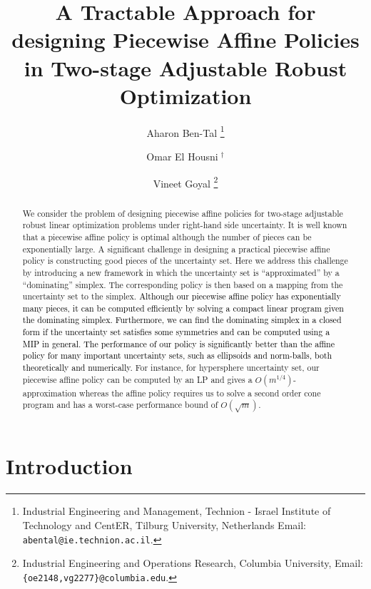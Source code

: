 \documentclass[11pt]{article}
\title{ A Tractable Approach for designing Piecewise Affine Policies in Two-stage Adjustable Robust Optimization}
\author{Aharon Ben-Tal  \thanks{Industrial Engineering and Management, Technion - Israel Institute of Technology and CentER, Tilburg University, Netherlands Email: \texttt{abental@ie.technion.ac.il}.} \and Omar El Housni$\;^{\dagger}$ \and Vineet Goyal \thanks{Industrial Engineering and Operations Research, Columbia University, Email: \texttt{\{oe2148,vg2277\}@columbia.edu}. }}
\theoremstyle{plain}
\theoremstyle{definition}
\numberwithin{equation}{section}%
\numberwithin{equation}{section}%
\newcommand*{\red}{\textcolor{black}}
\begin{document}
\maketitle
\begin{abstract}
We consider the problem of designing piecewise affine policies for
two-stage adjustable robust linear optimization problems under right-hand side
uncertainty. It is well known that a piecewise affine policy is optimal although the number of pieces can be
exponentially large. A significant challenge in designing a practical piecewise affine policy is constructing good pieces of the uncertainty set. Here we address this challenge by introducing a new framework in which the uncertainty set is ``approximated'' by a ``dominating'' simplex. The corresponding policy is then based on a mapping from the uncertainty set to the simplex. \red{Although our piecewise affine policy has exponentially many pieces, it can be computed efficiently by solving a compact linear program given the dominating simplex. Furthermore, we can find the dominating simplex in a closed form if the uncertainty set satisfies some symmetries and can be computed using a MIP in general. The performance of our policy is significantly better than the affine policy for many important uncertainty sets, such as ellipsoids and norm-balls, both theoretically and numerically.} For instance, for hypersphere uncertainty set, our piecewise affine policy can be computed by an LP and gives a $O(m^{1/4})$-approximation whereas the affine policy requires us to solve a second order cone program and has a worst-case performance bound of $O(\sqrt m)$.


\end{abstract}

\section{Introduction}
\end{document}

